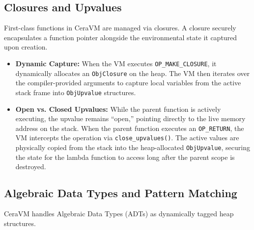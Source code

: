\documentclass[11pt, a4paper]{article}
\begin{document}
\subsection{Closures and Upvalues}
\noindent
First-class functions in CeraVM are managed via closures. A closure securely encapsulates a function pointer alongside the environmental state it captured upon creation.

\begin{itemize}
    \item \textbf{Dynamic Capture:} When the VM executes \texttt{OP\_MAKE\_CLOSURE}, it dynamically allocates an \texttt{ObjClosure} on the heap. The VM then iterates over the compiler-provided arguments to capture local variables from the active stack frame into \texttt{ObjUpvalue} structures.
    \item \textbf{Open vs. Closed Upvalues:} While the parent function is actively executing, the upvalue remains ``open,'' pointing directly to the live memory address on the stack. When the parent function executes an \texttt{OP\_RETURN}, the VM intercepts the operation via \texttt{close\_upvalues()}. The active values are physically copied from the stack into the heap-allocated \texttt{ObjUpvalue}, securing the state for the lambda function to access long after the parent scope is destroyed.
\end{itemize}

\subsection{Algebraic Data Types and Pattern Matching}
\noindent
CeraVM handles Algebraic Data Types (ADTs) as dynamically tagged heap structures.
\end{document}
